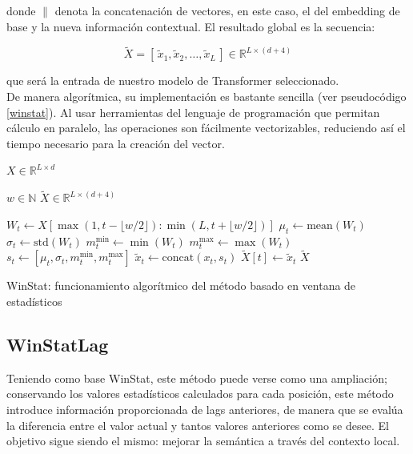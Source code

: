 donde $\|$ denota la concatenación de vectores, en este caso, el del embedding de base y la nueva información contextual. El resultado global es la secuencia:

\[
\tilde{X} = [\,\tilde{x}_1, \tilde{x}_2, \dots, \tilde{x}_L\,] \in \mathbb{R}^{L \times (d+4)}
\]

que será la entrada de nuestro modelo de Transformer seleccionado.\\

De manera algorítmica, su implementación es bastante sencilla (ver pseudocódigo \ref{winstat}). Al usar herramientas del lenguaje de programación que permitan cálculo en paralelo, las operaciones son fácilmente vectorizables, reduciendo así el tiempo necesario para la creación del vector.


\begin{algorithm}[!ht]
	\begin{algorithmic}[1]
		\Require 
		$X \in \mathbb{R}^{L \times d}$ 
		
		$w \in \mathbb{N}$ 
		\Ensure 
		$\tilde{X} \in \mathbb{R}^{L \times (d+4)}$
		
		\State $W_t \gets X[\max(1, t - \lfloor w/2 \rfloor) : \min(L, t + \lfloor w/2 \rfloor)]$
		\State $\mu_t \gets \text{mean}(W_t)$
		\State $\sigma_t \gets \text{std}(W_t)$
		\State $m^{\min}_t \gets \min(W_t)$
		\State $m^{\max}_t \gets \max(W_t)$
		\State $s_t \gets [\mu_t, \sigma_t, m^{\min}_t, m^{\max}_t]$
		\State $\tilde{x}_t \gets \text{concat}(x_t, s_t)$
		\State $\tilde{X}[t] \gets \tilde{x}_t$
		\EndFor
		\State \Return $\tilde{X}$
	\end{algorithmic}
	\caption{WinStat: funcionamiento algorítmico del método basado en ventana de estadísticos}
	\label{winstat}
\end{algorithm}

\subsection{WinStatLag}

Teniendo como base WinStat, este método puede verse como una ampliación; conservando los valores estadísticos calculados para cada posición, este método introduce información proporcionada de lags anteriores, de manera que se evalúa la diferencia entre el valor actual y tantos valores anteriores como se desee. El objetivo sigue siendo el mismo: mejorar la semántica a través del contexto local.

